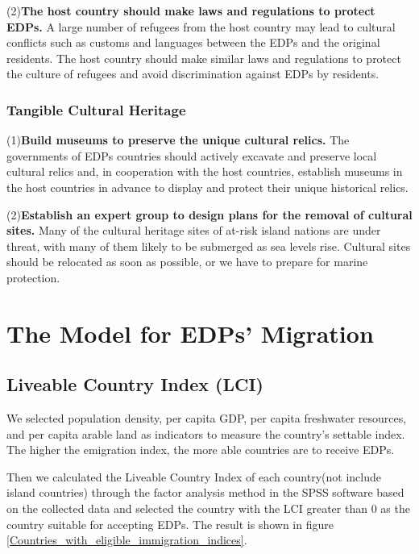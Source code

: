 \documentclass[12pt]{article}  %
\begin{document}
(2)\textbf{The host country should make laws and regulations to protect EDPs.} A large number of refugees from the host country may lead to cultural conflicts such as customs and languages between the EDPs and the original residents. The host country should make similar laws and regulations to protect the culture of refugees and avoid discrimination against EDPs by residents.







\subsubsection{Tangible Cultural Heritage}

(1)\textbf{Build museums to preserve the unique cultural relics.} The governments of EDPs countries should actively excavate and preserve local cultural relics and, in cooperation with the host countries, establish museums in the host countries in advance to display and protect their unique historical relics.



(2)\textbf{Establish an expert group to design plans for the removal of cultural sites.} Many of the cultural heritage sites of at-risk island nations are under threat, with many of them likely to be submerged as sea levels rise. Cultural sites should be relocated as soon as possible, or we have to prepare for marine protection. 


\newpage


\section{The Model for EDPs’ Migration}

\subsection{Liveable Country Index (LCI)}
We selected population density, per capita GDP, per capita freshwater resources, and per capita arable land as indicators to measure the country's settable index. The higher the emigration index, the more able countries are to receive EDPs.

Then we calculated the Liveable Country Index of each country(not include island countries) through the factor analysis method in the SPSS software based on the collected data and selected the country with the LCI greater than 0 as the country suitable for accepting EDPs. The result is shown in figure \ref{Countries_with_eligible_immigration_indices}.
\end{document}

